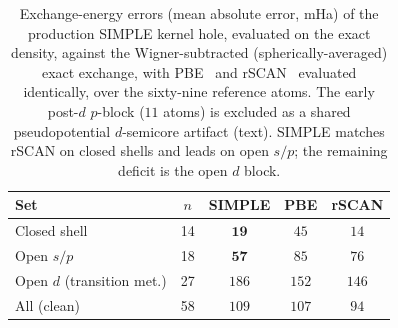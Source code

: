 \documentclass[aps,prb,reprint,superscriptaddress,nofootinbib]{revtex4-2}
\begin{document}
\begin{table}[tb]
\centering
\caption{Exchange-energy errors (mean absolute error, mHa) of the production SIMPLE kernel hole,
evaluated on the exact density, against the Wigner-subtracted (spherically-averaged) exact exchange,
with PBE~\cite{Perdew_1996} and
rSCAN~\cite{Bart_k_2019} evaluated identically, over the sixty-nine reference atoms. The early post-$d$
$p$-block ($11$ atoms) is excluded as a shared pseudopotential $d$-semicore artifact (text). SIMPLE matches
rSCAN on closed shells and leads on open $s/p$; the remaining deficit is the open $d$ block.}
\label{tab:allatom}
\begin{tabular}{lcccc}
\toprule
Set & $n$ & SIMPLE & PBE & rSCAN \\
\midrule
Closed shell              & 14 & $\mathbf{19}$  & $45$  & $14$  \\
Open $s/p$                & 18 & $\mathbf{57}$  & $85$  & $76$  \\
Open $d$ (transition met.)& 27 & $186$          & $152$ & $146$ \\
\midrule
All (clean)               & 58 & $109$          & $107$ & $94$  \\
\bottomrule
\end{tabular}
\end{table}



\appendix

\end{document}
